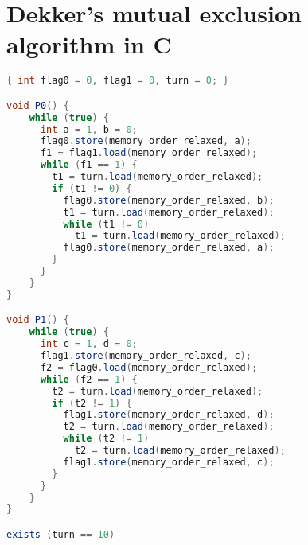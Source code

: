 \section{Dekker's mutual exclusion algorithm in C}
\label{apx:dekker}


\begin{lstlisting}[language=Java,morekeywords={memory_order_relaxed}]
{ int flag0 = 0, flag1 = 0, turn = 0; }

void P0() {
    while (true) {
      int a = 1, b = 0;
      flag0.store(memory_order_relaxed, a);
      f1 = flag1.load(memory_order_relaxed);
      while (f1 == 1) {
        t1 = turn.load(memory_order_relaxed);
        if (t1 != 0) {
          flag0.store(memory_order_relaxed, b);
          t1 = turn.load(memory_order_relaxed);
          while (t1 != 0)
            t1 = turn.load(memory_order_relaxed);
          flag0.store(memory_order_relaxed, a);
        }
      }
    }
}

void P1() {
    while (true) {
      int c = 1, d = 0;
      flag1.store(memory_order_relaxed, c);
      f2 = flag0.load(memory_order_relaxed);
      while (f2 == 1) {
        t2 = turn.load(memory_order_relaxed);
        if (t2 != 1) {
          flag1.store(memory_order_relaxed, d);
          t2 = turn.load(memory_order_relaxed);
          while (t2 != 1)
            t2 = turn.load(memory_order_relaxed);
          flag1.store(memory_order_relaxed, c);
        }
      }
    }
}

exists (turn == 10)
\end{lstlisting}
